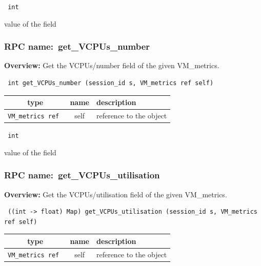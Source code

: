 \vspace{0.3cm}

{\tt 
int
}


value of the field
\vspace{0.3cm}
\vspace{0.3cm}
\vspace{0.3cm}
\subsubsection{RPC name:~get\_VCPUs\_number}

{\bf Overview:} 
Get the VCPUs/number field of the given VM\_metrics.

\begin{verbatim} int get_VCPUs_number (session_id s, VM_metrics ref self)\end{verbatim}



 
\vspace{0.3cm}
\begin{tabular}{|c|c|p{7cm}|}
 \hline
{\bf type} & {\bf name} & {\bf description} \\ \hline
{\tt VM\_metrics ref } & self & reference to the object \\ \hline 

\end{tabular}

\vspace{0.3cm}

{\tt 
int
}


value of the field
\vspace{0.3cm}
\vspace{0.3cm}
\vspace{0.3cm}
\subsubsection{RPC name:~get\_VCPUs\_utilisation}

{\bf Overview:} 
Get the VCPUs/utilisation field of the given VM\_metrics.

\begin{verbatim} ((int -> float) Map) get_VCPUs_utilisation (session_id s, VM_metrics ref self)\end{verbatim}



 
\vspace{0.3cm}
\begin{tabular}{|c|c|p{7cm}|}
 \hline
{\bf type} & {\bf name} & {\bf description} \\ \hline
{\tt VM\_metrics ref } & self & reference to the object \\ \hline 

\end{tabular}

